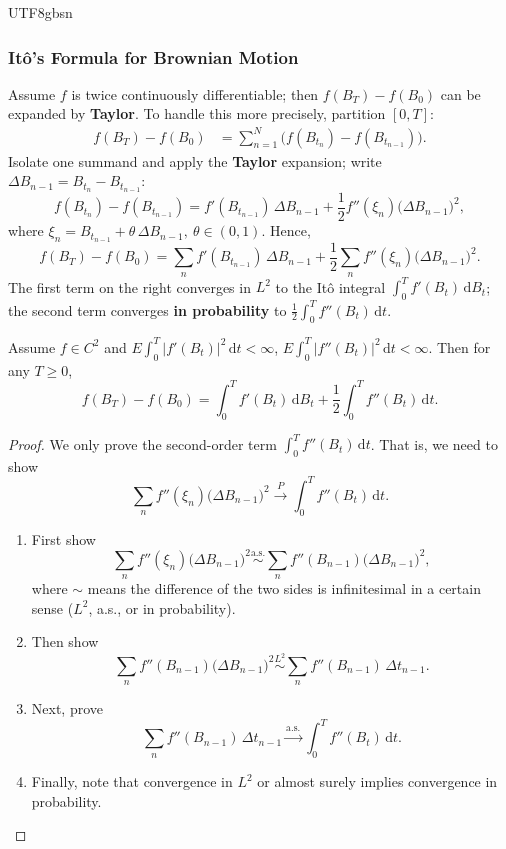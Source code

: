 \documentclass{article}
\begin{document}
\begin{CJK*}{UTF8}{gbsn}
\subsubsection{Itô’s Formula for Brownian Motion}
Assume $f$ is twice continuously differentiable; then $f(B_T)-f(B_0)$ can be expanded by \textbf{Taylor}. To handle this more precisely, partition $[0,T]$:
$$
\begin{aligned}
    f(B_T)-f(B_0)
    &=\sum_{n=1}^N\!\big(f(B_{t_n})-f(B_{t_{n-1}})\big).
\end{aligned}
$$
Isolate one summand and apply the \textbf{Taylor} expansion; write $\Delta B_{{n-1}}=B_{t_n}-B_{t_{n-1}}$:
$$
f(B_{t_n})-f(B_{t_{n-1}})=f'(B_{t_{n-1}})\,\Delta B_{{n-1}}+\frac{1}{2}f''(\xi_{n})\big(\Delta B_{{n-1}}\big)^2,
$$
where $\xi_n=B_{t_{n-1}}+\theta\,\Delta B_{{n-1}},\ \theta\in(0,1)$. Hence,
$$
f(B_T)-f(B_0)=\sum_n f'(B_{t_{n-1}})\,\Delta B_{{n-1}}+\frac{1}{2}\sum_n f''(\xi_{n})\big(\Delta B_{{n-1}}\big)^2.
$$
The first term on the right converges in $L^2$ to the Itô integral $\int_0^T f'(B_t)\,\mathrm{d}B_t$; the second term converges \textbf{in probability} to $\frac{1}{2}\int_0^T f''(B_t)\,\mathrm{d}t$.

\begin{theorem}
Assume $f\in C^2$ and $E\!\int_0^T|f'(B_t)|^2\,\mathrm{d}t<\infty$, $E\!\int_0^T|f''(B_t)|^2\,\mathrm{d}t<\infty$. Then for any $T\ge0$,
    $$
    f(B_T)-f(B_0)=\int_0^T f'(B_t)\,\mathrm{d}B_t+\frac{1}{2}\int_0^T f''(B_t)\,\mathrm{d}t.
    $$
\end{theorem}
\begin{proof}
We only prove the second-order term $\int_0^T f''(B_t)\,\mathrm{d}t$. That is, we need to show
$$
\sum_n f''(\xi_{n})\big(\Delta B_{{n-1}}\big)^2
\stackrel{P}{\longrightarrow}\int_0^T f''(B_t)\,\mathrm{d}t.
$$
\begin{enumerate}
    \item First show
    $$
    \sum_n f''(\xi_{n})\big(\Delta B_{{n-1}}\big)^2\stackrel{\text{a.s.}}{\sim}\sum_n f''(B_{n-1})\big(\Delta B_{{n-1}}\big)^2,
    $$
    where $\sim$ means the difference of the two sides is infinitesimal in a certain sense ($L^2$, a.s., or in probability).
    \item Then show
    $$
    \sum_n f''(B_{n-1})\big(\Delta B_{{n-1}}\big)^2\stackrel{L^2}{\sim}\sum_n f''(B_{n-1})\,\Delta t_{{n-1}}.
    $$
    \item Next, prove
    $$
    \sum_n f''(B_{n-1})\,\Delta t_{{n-1}}\stackrel{\text{a.s.}}{\longrightarrow}\int_0^T f''(B_t)\,\mathrm{d}t.
    $$
    \item Finally, note that convergence in $L^2$ or almost surely implies convergence in probability.
\end{enumerate}
\end{proof}


\end{CJK*}
\end{document}
